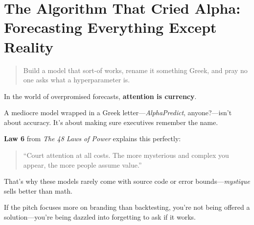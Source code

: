\section{The Algorithm That Cried Alpha: Forecasting Everything Except Reality}


\begin{quote}
Build a model that sort-of works, rename it something Greek, and pray no one asks what a hyperparameter is.
\end{quote}


  In the world of overpromised forecasts, \textbf{attention is currency}.
  
  \medskip
  
  A mediocre model wrapped in a Greek letter—\textit{AlphaPredict\texttrademark}, anyone?—isn’t about accuracy. It’s about making sure executives remember the name.
  
  \medskip
  
  \textbf{Law 6} from \textit{The 48 Laws of Power} explains this perfectly:
  \begin{quote}
  ``Court attention at all costs. The more mysterious and complex you appear, the more people assume value.''
  \end{quote}
  
  \medskip
  
  That’s why these models rarely come with source code or error bounds—\textit{mystique} sells better than math.
  
  \medskip
  
  If the pitch focuses more on branding than backtesting, you're not being offered a solution—you’re being dazzled into forgetting to ask if it works.
  
  



